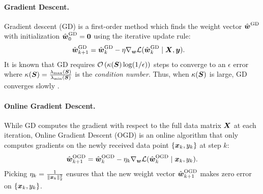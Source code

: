 \paragraph{Gradient Descent.}  Gradient descent (GD) is a first-order method which finds the weight vector $\hat{\boldsymbol{w}}^\mathrm{GD}$ with initialization $\hat{\boldsymbol{w}}^\mathrm{GD}_0 = \boldsymbol{0}$ using the iterative update rule:
\begin{equation}
\begin{aligned}
    & \hat{\boldsymbol{w}}^\mathrm{GD}_{k+1} = \hat{\boldsymbol{w}}^\mathrm{GD}_{k} - \eta \nabla_{\boldsymbol{w}} \mathcal L(\hat{\boldsymbol{w}}^\mathrm{GD}_{k} \mid \boldsymbol{X}, \boldsymbol{y}).
\end{aligned}
\end{equation}
It is known that GD requires $\mathcal O\left(\kappa(\boldsymbol{S}) \log(1/\epsilon)\right)$  steps to converge to an $\epsilon$ error where $\kappa(\boldsymbol{S}) = \frac{\lambda_{\max}(\boldsymbol{S})}{\lambda_{\min}(\boldsymbol{S})}$ is the \textit{condition number}. Thus, when $\kappa(\boldsymbol{S})$ is large, GD converges slowly \citep{boyd2004convex}. 

\paragraph{Online Gradient Descent.}
While GD computes the gradient with respect to the full data matrix $\boldsymbol{X}$ at each iteration, Online Gradient Descent (OGD) is an online algorithm that only computes gradients on the newly received data point $\{\boldsymbol{x}_k, y_k\}$ at step $k$:
\begin{equation}
    \hat{\boldsymbol{w}}^\mathrm{OGD}_{k+1} = \hat{\boldsymbol{w}}^\mathrm{OGD}_{k} - \eta_k \nabla_{\boldsymbol{w}} \mathcal L(\hat{\boldsymbol{w}}^\mathrm{OGD}_{k} \mid \boldsymbol{x}_k, y_k).
\end{equation}
Picking $\eta_k = \frac{1}{\|\boldsymbol{x}_k\|_2^2}$ ensures that the new weight vector $\hat{\boldsymbol{w}}^\mathrm{OGD}_{k+1}$ makes zero error on $\{\boldsymbol{x}_k, y_k\}$. 


